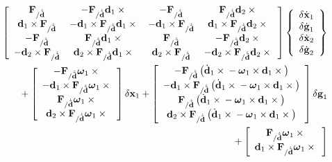 \documentclass[10pt,dvips,fleqn,subeqn]{report}
\newcommand{\T}[1]{\bm{\mathbf{#1}}}
\begin{document}
\begin{align}
	\sqbr{\matr{cccc}{
		\T{F}_{/\dot{\tilde{\T{d}}}} & -\T{F}_{/\dot{\tilde{\T{d}}}} \T{d}_1\times{} &
			- \T{F}_{/\dot{\tilde{\T{d}}}} & \T{F}_{/\dot{\tilde{\T{d}}}} \T{d}_2\times{} \\
		\T{d}_1 \times \T{F}_{/\dot{\tilde{\T{d}}}} &
			- \T{d}_1 \times \T{F}_{/\dot{\tilde{\T{d}}}} \T{d}_1\times{} &
			- \T{d}_1 \times \T{F}_{/\dot{\tilde{\T{d}}}} &
			\T{d}_1 \times \T{F}_{/\dot{\tilde{\T{d}}}} \T{d}_2\times{} \\
		- \T{F}_{/\dot{\tilde{\T{d}}}} & \T{F}_{/\dot{\tilde{\T{d}}}} \T{d}_1\times{} &
			\T{F}_{/\dot{\tilde{\T{d}}}} & - \T{F}_{/\dot{\tilde{\T{d}}}} \T{d}_2\times{} \\
		- \T{d}_2 \times \T{F}_{/\dot{\tilde{\T{d}}}} &
			\T{d}_2 \times \T{F}_{/\dot{\tilde{\T{d}}}} \T{d}_1\times{} &
			\T{d}_2 \times \T{F}_{/\dot{\tilde{\T{d}}}} &
			- \T{d}_2 \times \T{F}_{/\dot{\tilde{\T{d}}}} \T{d}_2\times{}
	}} \cubr{\cvvect{
		\delta\dot{\T{x}}_1 \\
		\delta\dot{\T{g}}_1 \\
		\delta\dot{\T{x}}_2 \\
		\delta\dot{\T{g}}_2
	}}
	& \nonumber \\
%
%
%
	\mbox{}
	+ \sqbr{\cvvect{
		- \T{F}_{/\dot{\tilde{\T{d}}}} \T{\omega}_1 \times{} \\
		- \T{d}_1 \times \T{F}_{/\dot{\tilde{\T{d}}}} \T{\omega}_1 \times{} \\
		\T{F}_{/\dot{\tilde{\T{d}}}} \T{\omega}_1 \times{} \\
		\T{d}_2 \times \T{F}_{/\dot{\tilde{\T{d}}}} \T{\omega}_1 \times{}
	}} \delta\T{x}_1 
%
	+ \sqbr{\cvvect{
		- \T{F}_{/\dot{\tilde{\T{d}}}} \plbr{
			\dot{\T{d}}_1 \times{} - \T{\omega}_1 \times \T{d}_1\times{}
		} \\
		- \T{d}_1 \times \T{F}_{/\dot{\tilde{\T{d}}}} \plbr{
			\dot{\T{d}}_1 \times{} - \T{\omega}_1 \times \T{d}_1\times{}
		} \\
		\T{F}_{/\dot{\tilde{\T{d}}}} \plbr{
			\dot{\T{d}}_1 \times{} - \T{\omega}_1 \times \T{d}_1\times{}
		} \\
		\T{d}_2 \times \T{F}_{/\dot{\tilde{\T{d}}}} \plbr{
			\dot{\T{d}}_1 \times{} - \T{\omega}_1 \times \T{d}_1\times{}
		}
	}} \delta\T{g}_1
	& \nonumber \\
%
	\mbox{}
	+ \sqbr{\cvvect{
		\T{F}_{/\dot{\tilde{\T{d}}}} \T{\omega}_1 \times{} \\
		\T{d}_1 \times \T{F}_{/\dot{\tilde{\T{d}}}} \T{\omega}_1 \times{} \\
}}
\end{align}
\end{document}
